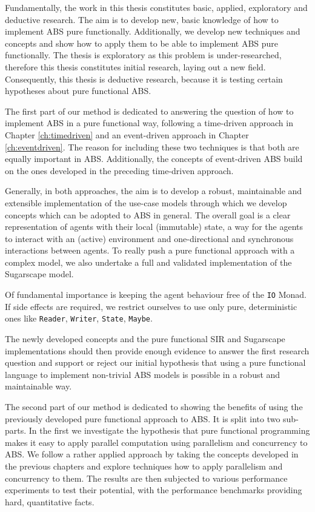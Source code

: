 Fundamentally, the work in this thesis constitutes basic, applied, exploratory and deductive research. The aim is to develop new, basic knowledge of how to implement ABS pure functionally. Additionally, we develop new techniques and concepts and show how to apply them to be able to implement ABS pure functionally. The thesis is exploratory as this problem is under-researched, therefore this thesis constitutes initial research, laying out a new field. Consequently, this thesis is deductive research, because it is testing certain hypotheses about pure functional ABS.

\medskip

The first part of our method is dedicated to answering the question of how to implement ABS in a pure functional way, following a time-driven approach in Chapter \ref{ch:timedriven} and an event-driven approach in Chapter \ref{ch:eventdriven}. The reason for including these two techniques is that both are equally important in ABS. Additionally, the concepts of event-driven ABS build on the ones developed in the preceding time-driven approach.

Generally, in both approaches, the aim is to develop a robust, maintainable and extensible implementation of the use-case models through which we develop concepts which can be adopted to ABS in general. The overall goal is a clear representation of agents with their local (immutable) state, a way for the agents to interact with an (active) environment and one-directional and synchronous interactions between agents. To really push a pure functional approach with a complex model, we also undertake a full and validated implementation of the Sugarscape model.

Of fundamental importance is keeping the agent behaviour free of the \texttt{IO} Monad. If side effects are required, we restrict ourselves to use only pure, deterministic ones like \texttt{Reader}, \texttt{Writer}, \texttt{State}, \texttt{Maybe}.

The newly developed concepts and the pure functional SIR and Sugarscape implementations should then provide enough evidence to answer the first research question and support or reject our initial hypothesis that using a pure functional language to implement non-trivial ABS models is possible in a robust and maintainable way.

\medskip

The second part of our method is dedicated to showing the benefits of using the previously developed pure functional approach to ABS. It is split into two sub-parts. In the first we investigate the hypothesis that pure functional programming makes it easy to apply parallel computation using parallelism and concurrency to ABS. We follow a rather applied approach by taking the concepts developed in the previous chapters and explore techniques how to apply parallelism and concurrency to them. The results are then subjected to various performance experiments to test their potential, with the performance benchmarks providing hard, quantitative facts.


